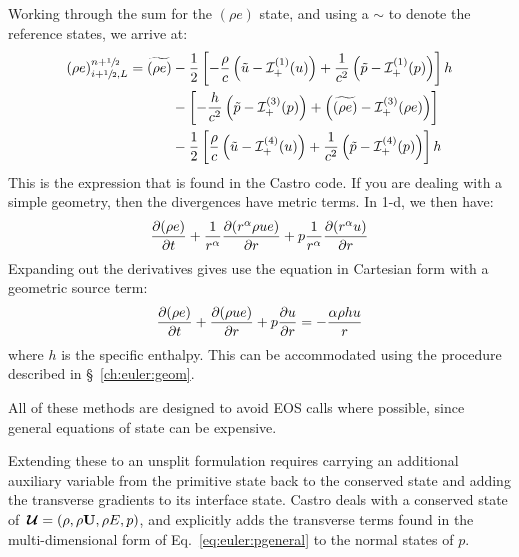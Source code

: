 Working through the sum for the $(\rho e)$ state, and using a $\sim$ to
denote the reference states, we arrive at:
\begin{align}
(\rho e)_{i+{\sfrac{1}{2}},L}^{n+{\sfrac{1}{2}}} = \widetilde{(\rho e)} &-
   \frac{1}{2} \left [ -\frac{\rho}{c} \left (\tilde{u} - {\mathcal{I}}^{(1)}_+(u) \right )
                       +\frac{1}{c^2} \left (\tilde{p} - {\mathcal{I}}^{(1)}_+(p) \right )
               \right ] h \nonumber \\
  &-
    \left [ -\frac{h}{c^2} \left (\tilde{p} - {\mathcal{I}}^{(3)}_+(p) \right )
                       + \left (\widetilde{(\rho e)} - {\mathcal{I}}^{(3)}_+(\rho e) \right )
               \right ] \nonumber \\
  &-
   \frac{1}{2} \left [ \frac{\rho}{c} \left (\tilde{u} - {\mathcal{I}}^{(4)}_+(u) \right )
                       +\frac{1}{c^2} \left (\tilde{p} - {\mathcal{I}}^{(4)}_+(p) \right )
               \right ] h
\end{align}
This is the expression that is found in the Castro code.  If you are dealing with
a simple geometry, then the divergences have metric terms.  In 1-d, we then have:
\begin{equation}
 {\frac{{\partial(\rho e)}}{\partial t}} + \frac{1}{r^\alpha} {\frac{{\partial(r^\alpha \rho u e)}}{\partial r}} + p \frac{1}{r^\alpha} {\frac{{\partial(r^\alpha u)}}{\partial r}}
\end{equation}
Expanding out the derivatives gives use the equation in Cartesian form with a geometric source term:
\begin{equation}
 {\frac{{\partial(\rho e)}}{\partial t}} + {\frac{{\partial(\rho u e)}}{\partial r}} + p {\frac{{\partial u}}{\partial r}} = -\frac{\alpha \rho hu}{r}
\end{equation}
where $h$ is the specific enthalpy.  This can be accommodated using
the procedure described in \S~\ref{ch:euler:geom}.

All of these methods are designed to avoid EOS calls where possible,
since general equations of state can be expensive.

Extending these to an unsplit formulation requires carrying an additional
auxiliary variable from the primitive state back to the conserved state
and adding the transverse gradients to its interface state.  Castro
deals with a conserved state of ${\,\boldsymbol{\mathcal{U}}} = (\rho, \rho {\bf U}, \rho E, p)$, and
explicitly adds the transverse terms found in the multi-dimensional form
of Eq.~\ref{eq:euler:pgeneral}
to the normal states of $p$.



